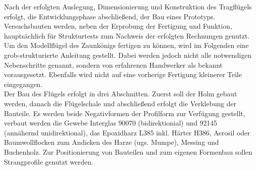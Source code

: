 Nach der erfolgten Auslegung, Dimensionierung und Konstruktion des Tragflügels erfolgt, die Entwicklungsphase abschließend, der Bau eines Prototyps. Versuchsbauten werden, neben der Erprobung der Fertigung und Funktion, hauptsächlich für Strukturtests zum Nachweis der erfolgten Rechnungen genutzt. Um den Modellflügel des Zaunkönigs fertigen zu können, wird im Folgenden eine grob-strukturierte Anleitung gestellt. Dabei werden jedoch nicht alle notwendigen Nebenschritte genannt, sondern von erfahrenen Handwerker als bekannt vorausgesetzt. Ebenfalls wird nicht auf eine vorherige Fertigung kleinerer Teile eingegangen.\\

\noindent Der Bau des Flügels erfolgt in drei Abschnitten. Zuerst soll der Holm gebaut werden, danach die Flügelschale und abschließend erfolgt die Verklebung der Bauteile.
Es werden beide Negativformen der Profilform zur Verfügung gestellt, verbaut werden die Gewebe Interglas 90070 (bidirektionial) und 92145 (annähernd unidirektional), das Epoxidharz L385 inkl. Härter H386, Aerosil oder Baumwollflocken zum Andicken des Harze (ugs. Mumpe), Messing und Buchenholz. Zur Positionierung von Bauteilen und zum eigenen Formenbau sollen Strangprofile genutzt werden. 

